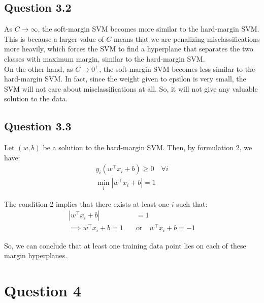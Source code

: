 \documentclass[a4paper]{article}
\begin{document}
\vspace{2ex}
\subsection*{Question 3.2}
\noindent As \(C \to \infty\), the soft-margin SVM becomes more similar to the hard-margin SVM. This is because a larger value of \(C\) means that we are penalizing misclassifications more heavily, which forces the SVM to find a hyperplane that separates the two classes with maximum margin, similar to the hard-margin SVM.\\

\noindent On the other hand, as \(C \to 0^+\), the soft-margin SVM becomes less similar to the hard-margin SVM. In fact, since the weight given to epsilon is very small, the SVM will not care about misclassifications at all. So, it will not give any valuable solution to the data.\\


\vspace{2ex}
\subsection*{Question 3.3}
\noindent Let \((w,b)\) be a solution to the hard-margin SVM. Then, by formulation 2, we have:
\begin{align*}
    y_i\left(w^\top x_i + b\right) \ge 0 \quad\forall i \\
    \min_i |w^\top x_i + b| = 1    
\end{align*}

\noindent The condition 2 implies that there exists at least one \(i\) such that:
\begin{align*}
    |w^\top x_i + b| &= 1 \\
    \implies w^\top x_i + b = 1 \quad&\text{or}\quad w^\top x_i + b = -1
\end{align*}

\noindent So, we can conclude that at least one training data point lies on each of these margin hyperplanes.\\


\newpage
\section*{Question 4}
\end{document}
